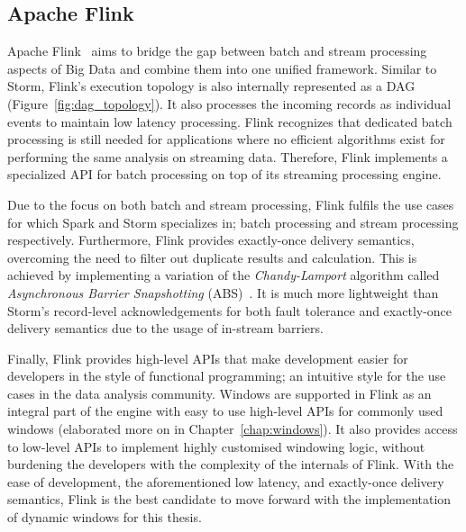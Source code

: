 \subsection{Apache Flink}%
\label{sub:Apache Flink}

Apache Flink~\cite{flink} aims to bridge the gap between batch and stream processing aspects of 
Big Data and combine them into one unified framework. Similar to Storm, 
Flink's execution topology is also internally represented as a DAG (Figure~\ref{fig:dag_topology}).
It also processes the incoming records as 
individual events to maintain low latency processing. Flink recognizes that
dedicated batch processing is still needed for applications where no efficient algorithms 
exist for performing the same analysis on streaming data. Therefore, Flink implements a 
specialized API for batch processing on top of its streaming processing engine.

Due to the focus on both batch and stream processing, Flink fulfils the use cases for which 
Spark and Storm specializes in; batch processing and stream processing respectively. Furthermore, 
Flink provides exactly-once delivery semantics, overcoming the need to filter out duplicate 
results and calculation. This is achieved by implementing a variation of the \emph{Chandy-Lamport} algorithm
called \emph{Asynchronous Barrier Snapshotting} (ABS)~\cite{asynchronous_barrier}.
It is much more lightweight than Storm's record-level 
acknowledgements for both fault tolerance and exactly-once delivery semantics
due to the usage of in-stream barriers.  

Finally, Flink provides high-level APIs that make development easier for developers in 
the style of functional programming; an intuitive style for the use cases in the data analysis community. 
Windows are supported in Flink as an integral part of the engine with easy to use high-level APIs for 
commonly used windows (elaborated more on in Chapter~\ref{chap:windows}).  
It also provides access to low-level APIs to implement highly customised windowing logic, without burdening 
the developers with the complexity of the internals of Flink. 
With the ease of development, the aforementioned low latency, and exactly-once delivery semantics, 
Flink is the best candidate to move forward with the implementation of dynamic windows for this thesis. 
